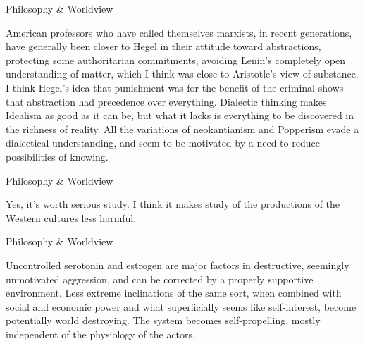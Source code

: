 \documentclass[11pt,oneside,openany,extrafontsizes]{memoir}
\begin{document}
\begin{standalonequote}{Philosophy \& Worldview}

    \begin{answer}
      American professors who have called themselves marxists, in recent generations, have generally been closer to Hegel in their attitude toward abstractions, protecting some authoritarian commitments, avoiding Lenin's completely open understanding of matter, which I think was close to Aristotle's view of substance. I think Hegel's idea that punishment was for the benefit of the criminal shows that abstraction had precedence over everything. Dialectic thinking makes Idealism as good as it can be, but what it lacks is everything to be discovered in the richness of reality. All the variations of neokantianism and Popperism evade a dialectical understanding, and seem to be motivated by a need to reduce possibilities of knowing.
    \end{answer}
\end{standalonequote}

\begin{standalonequote}{Philosophy \& Worldview}

    \begin{answer}
      Yes, it's worth serious study. I think it makes study of the productions of the Western cultures less harmful.
    \end{answer}
\end{standalonequote}

\begin{standalonequote}{Philosophy \& Worldview}

    \begin{answer}
      Uncontrolled serotonin and estrogen are major factors in destructive, seemingly unmotivated aggression, and can be corrected by a properly supportive environment. Less extreme inclinations of the same sort, when combined with social and economic power and what superficially seems like self-interest, become potentially world destroying. The system becomes self-propelling, mostly independent of the physiology of the actors.
    \end{answer}
\end{standalonequote}
\end{document}
